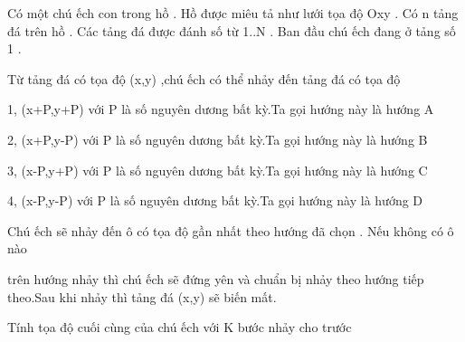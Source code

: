 Có một chú ếch con trong hồ . Hồ được miêu tả như lưới tọa độ Oxy . Có n tảng đá trên hồ . Các tảng đá được đánh số từ 1..N . Ban đầu chú ếch đang ở tảng số 1 .  

   Từ tảng đá có tọa độ (x,y) ,chú ếch có thể nhảy đến tảng đá có tọa độ  

   1, (x+P,y+P) với P là số nguyên dương bất kỳ.Ta gọi hướng này là hướng A  

   2, (x+P,y-P) với P là số nguyên dương bất kỳ.Ta gọi hướng này là hướng B  

   3, (x-P,y+P) với P là số nguyên dương bất kỳ.Ta gọi hướng này là hướng C  

   4, (x-P,y-P) với P là số nguyên dương bất kỳ.Ta gọi hướng này là hướng D  

   Chú ếch sẽ nhảy đến ô có tọa độ gần nhất theo hướng đã chọn . Nếu không có ô nào  

   trên hướng nhảy thì chú ếch sẽ đứng yên và chuẩn bị nhảy theo hướng tiếp theo.Sau khi nhảy thì tảng đá (x,y) sẽ biến mất.  

   Tính tọa độ cuối cùng của chú ếch với K bước nhảy cho trước